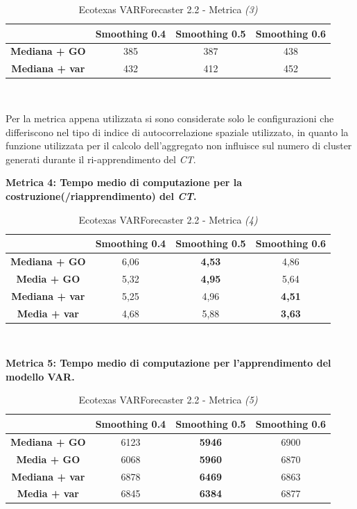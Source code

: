 \documentclass[12pt,a4paper,oneside,openright]{book}
\begin{document}
\medskip

\begin{table}[H]
\centering
\begin{tabular}[H]{|c|c|c|c|}
\hline
& Smoothing 0.4 & Smoothing 0.5 & Smoothing 0.6\\
\hline
\textbf{Mediana + GO} & 385 & 387 & 438\\ 
\hline
\textbf{Mediana + var} & 432 & 412 & 452\\ 
\hline
\end{tabular} \\
\caption{Ecotexas VARForecaster 2.2 - Metrica \textit{(3)}}
\end{table}

\medskip

Per la metrica appena utilizzata si sono considerate solo le configurazioni che differiscono nel tipo di indice di autocorrelazione spaziale utilizzato, in quanto la funzione utilizzata per il calcolo dell'aggregato non influisce sul numero di cluster generati durante il ri-apprendimento del \textit{CT}.

\newpage

\textbf{Metrica 4: Tempo medio di computazione per la costruzione(/riapprendimento) del \textit{CT}.}

\medskip

\begin{table}[H]
\centering
\begin{tabular}[H]{|c|c|c|c|}
\hline
& Smoothing 0.4 & Smoothing 0.5 & Smoothing 0.6\\
\hline
\textbf{Mediana + GO} & 6,06 & \textbf{4,53} & 4,86\\ 
\hline
\textbf{Media + GO} & 5,32 & \textbf{4,95} & 5,64\\ 
\hline
\textbf{Mediana + var} & 5,25 & 4,96 & \textbf{4,51}\\ 
\hline
\textbf{Media + var} & 4,68 & 5,88 & \textbf{3,63}\\ 
\hline
\end{tabular} \\
\caption{Ecotexas VARForecaster 2.2 - Metrica \textit{(4)}}
\end{table}

\medskip

\textbf{Metrica 5: Tempo medio di computazione per l'apprendimento del modello VAR.}

\medskip

\begin{table}[H]
\centering
\begin{tabular}[H]{|c|c|c|c|}
\hline
& Smoothing 0.4 & Smoothing 0.5 & Smoothing 0.6\\
\hline
\textbf{Mediana + GO} & 6123 & \textbf{5946} & 6900\\ 
\hline
\textbf{Media + GO} & 6068 & \textbf{5960} & 6870\\ 
\hline
\textbf{Mediana + var} & 6878 & \textbf{6469} & 6863\\ 
\hline
\textbf{Media + var} & 6845 & \textbf{6384} & 6877\\ 
\hline
\end{tabular} \\
\caption{Ecotexas VARForecaster 2.2 - Metrica \textit{(5)}}
\end{table}
\end{document}
